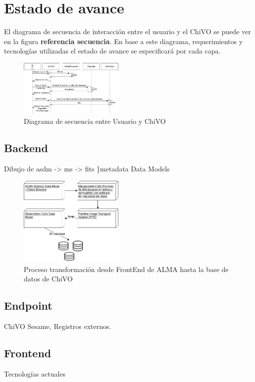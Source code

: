 \section{Estado de avance}

El diagrama de secuencia de interacción entre el usuario y el ChiVO se puede
ver en la figura \textbf{referencia secuencia}. En base a este diagrama, requerimientos y
tecnologías utilizadas el estado de avance se especificará por cada capa.

\begin{figure}[h]
    \centering
    \includegraphics[width=0.45\textwidth]{images/secuencia.png}
    \caption{Diagrama de secuencia entre Usuario y ChiVO}
    \label{fig:secuencia}
\end{figure}

\subsection{Backend}
Dibujo de asdm -> ms -> fits \}metadata
Data Models

\begin{figure}[h]
    \centering
    \includegraphics[width=0.45\textwidth]{images/metadata.png}
    \caption{Proceso transformación desde FrontEnd de ALMA hasta la base de datos de ChiVO}
    \label{fig:metadata}
\end{figure}



\subsection{Endpoint}
ChiVO Sesame, Registros externos.

\subsection{Frontend}
Tecnologías actuales
